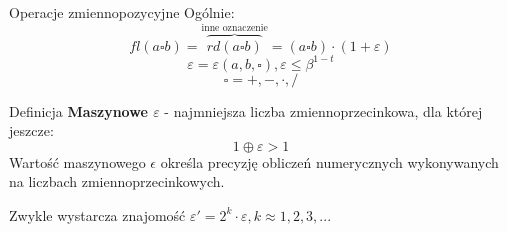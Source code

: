 \begin{frame}{Operacje zmiennopozycyjne}
    Ogólnie:
    \[
    fl(a \square b) = \overbrace{rd(a \square b)}^{\text{inne oznaczenie}} = (a \square b) \cdot (1 + \varepsilon)
    \] \[
    \varepsilon = \varepsilon(a, b, \square), \varepsilon \le \beta^{1-t}
    \] \[
    \square = +, -, \cdot, /
    \]

    \begin{block}{Definicja}
        {\bf Maszynowe $\varepsilon$} - najmniejsza liczba zmiennoprzecinkowa, dla której jeszcze: \[
        1 \oplus \varepsilon > 1
        \]
        Wartość maszynowego $\epsilon$ określa precyzję obliczeń numerycznych wykonywanych na liczbach zmiennoprzecinkowych.
    \end{block}

    Zwykle wystarcza znajomość $\varepsilon' = 2^k \cdot \varepsilon, k \approx 1, 2, 3, ...$ 
\end{frame}
